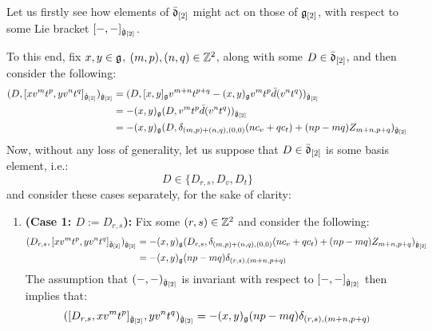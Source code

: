             \begin{remark} \label{remark: derivation_action_on_multiloop_algebras}
                Let us firstly see how elements of $\bar{\mathfrak{d}}_{[2]}$ might act on those of $\mathfrak{g}_{[2]}$, with respect to some Lie bracket $[-, -]_{\hat{\mathfrak{g}}_{[2]}}$. 

                To this end, fix $x, y \in \mathfrak{g}$, $(m, p), (n, q) \in \mathbb{Z}^2$, along with some $D \in \bar{\mathfrak{d}}_{[2]}$, and then consider the following:
                    $$
                        \begin{aligned}
                            ( D, [x v^m t^p, y v^n t^q]_{\tilde{\mathfrak{g}}_{[2]}} )_{\hat{\mathfrak{g}}_{[2]}} & = ( D, [x, y]_{\mathfrak{g}} v^{m + n} t^{p + q} - (x, y)_{\mathfrak{g}} v^m t^p \bar{d}( v^n t^q ) )_{\hat{\mathfrak{g}}_{[2]}}
                            \\
                            & = -(x, y)_{\mathfrak{g}} ( D, v^m t^p \bar{d}( v^n t^q ) )_{\hat{\mathfrak{g}}_{[2]}}
                            \\
                            & = -(x, y)_{\mathfrak{g}} ( D, \delta_{(m, p) + (n, q), (0, 0)} ( n c_v + q c_t ) + (np - mq) Z_{m + n, p + q} )_{\hat{\mathfrak{g}}_{[2]}}
                        \end{aligned}
                    $$
                Now, without any loss of generality, let us suppose that $D \in \bar{\mathfrak{d}}_{[2]}$ is some basis element, i.e.:
                    $$D \in \{ D_{r, s}, D_v, D_t \}$$
                and consider these cases separately, for the sake of clarity:
                \begin{enumerate}
                    \item \textbf{(Case 1: $D := D_{r, s}$):} Fix some $(r, s) \in \mathbb{Z}^2$ and consider the following:
                        $$
                            \begin{aligned}
                                ( D_{r, s}, [x v^m t^p, y v^n t^q]_{\tilde{\mathfrak{g}}_{[2]}} )_{\hat{\mathfrak{g}}_{[2]}} & = -(x, y)_{\mathfrak{g}} ( D_{r, s}, \delta_{(m, p) + (n, q), (0, 0)} ( n c_v + q c_t ) + (np - mq) Z_{m + n, p + q} )_{\hat{\mathfrak{g}}_{[2]}}
                                \\
                                & = -(x, y)_{\mathfrak{g}} (np - mq) \delta_{(r, s), (m + n, p + q)}
                            \end{aligned}
                        $$
                    The assumption that $(-, -)_{\hat{\mathfrak{g}}_{[2]}}$ is invariant with respect to $[-, -]_{\hat{\mathfrak{g}}_{[2]}}$ then implies that:
                        $$( [D_{r, s}, x v^m t^p]_{\hat{\mathfrak{g}}_{[2]}}, y v^n t^q )_{\hat{\mathfrak{g}}_{[2]}} = -(x, y)_{\mathfrak{g}} (np - mq) \delta_{(r, s), (m + n, p + q)}$$

\end{enumerate}
\end{remark}
